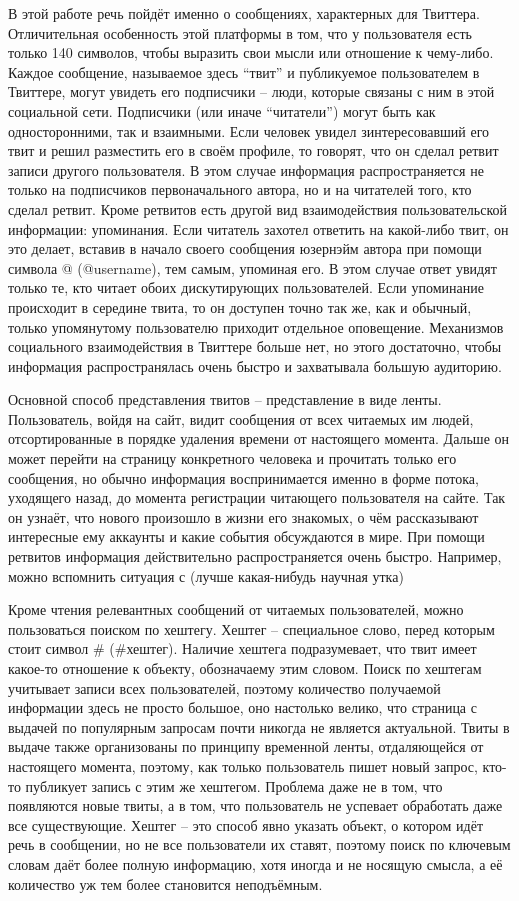 В этой работе речь пойдёт именно о сообщениях, характерных для Твиттера.
Отличительная особенность этой платформы в том, что у пользователя есть
только 140 символов, чтобы выразить свои мысли или отношение к чему-либо.
Каждое сообщение, называемое здесь ``твит'' и публикуемое пользователем в
Твиттере, могут увидеть его подписчики -- люди, которые связаны с ним в этой
социальной сети. Подписчики (или иначе ``читатели'') могут быть как
односторонними, так и взаимными. Если человек увидел зинтересовавший его твит
и решил разместить его в своём профиле, то говорят, что он сделал ретвит
записи другого пользователя. В этом случае информация распространяется не только
на подписчиков первоначального автора, но и на читателей того, кто сделал
ретвит. Кроме ретвитов есть другой вид взаимодействия пользовательской
информации: упоминания. Если читатель захотел ответить на какой-либо твит,
он это делает, вставив в начало своего сообщения юзернэйм автора при помощи
символа @ (@username), тем самым, упоминая его. В этом случае ответ увидят
только те, кто читает обоих дискутирующих пользователей. Если упоминание
происходит в середине твита, то он доступен точно так же, как и обычный,
только упомянутому пользователю приходит отдельное оповещение.
Механизмов социального взаимодействия в Твиттере больше нет, но этого достаточно,
чтобы информация распространялась очень быстро и захватывала большую аудиторию.

Основной способ представления твитов -- представление в виде ленты.
Пользователь, войдя на сайт, видит сообщения от всех читаемых им людей,
отсортированные в порядке удаления времени от настоящего момента. Дальше
он может перейти на страницу конкретного человека и прочитать только его
сообщения,  но обычно информация воспринимается именно в форме потока,
уходящего назад, до момента регистрации читающего пользователя на сайте.
Так он узнаёт, что нового произошло в жизни его знакомых, о чём рассказывают
интересные ему аккаунты и какие события обсуждаются в мире. При помощи ретвитов
информация действительно распространяется очень быстро. Например, можно
вспомнить ситуация с (лучше какая-нибудь научная утка)

Кроме чтения релевантных сообщений от читаемых пользователей, можно
пользоваться поиском по хештегу. Хештег -- специальное слово, перед которым
стоит символ # (#хештег). Наличие хештега подразумевает, что твит имеет какое-то
отношение к объекту, обозначаему этим словом. Поиск по хештегам учитывает
записи всех пользователей, поэтому количество получаемой информации здесь не
просто большое, оно настолько велико, что страница с выдачей по популярным
запросам почти никогда не является актуальной. Твиты в выдаче также организованы
по принципу временной ленты, отдаляющейся от настоящего момента, поэтому, как
только пользователь пишет новый запрос, кто-то публикует запись с этим же хештегом.
Проблема даже не в том, что появляются новые твиты, а в том, что пользователь не
успевает обработать даже все существующие. Хештег -- это способ явно указать объект, о
котором идёт речь в сообщении, но не все пользователи их ставят, поэтому поиск
по ключевым словам даёт более полную информацию, хотя иногда и не носящую смысла,
а её количество уж тем более становится неподъёмным.

